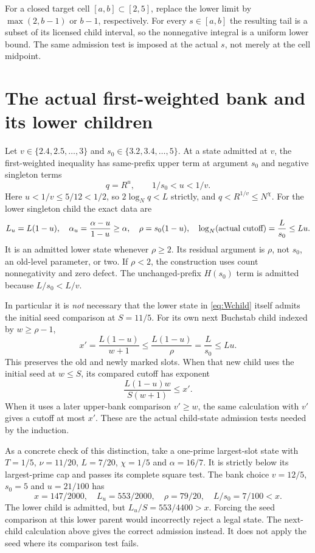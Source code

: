 \documentclass[11pt]{article}
\begin{document}
For a closed target cell $[a,b]\subset[2,5]$, replace the lower limit
by $\max(2,b-1)$ or $b-1$, respectively. For every $s\in[a,b]$ the
resulting tail is a subset of its licensed child interval, so the
nonnegative integral is a uniform lower bound. The same admission
test is imposed at the actual $s$, not merely at the cell midpoint.

\section{The actual first-weighted bank and its lower children}
Let $v\in\{2.4,2.5,\ldots,3\}$ and
$s_0\in\{3.2,3.4,\ldots,5\}$. At a state admitted at $v$, the
first-weighted inequality has same-prefix upper term at argument
$s_0$ and negative singleton terms
\[
 q=R^u,\qquad 1/s_0<u<1/v.
\]
Here $u<1/v\le5/12<1/2$, so $2\log_Nq<L$ strictly, and
$q<R^{1/v}\le N^\chi$. For the lower singleton child the exact data are
\begin{equation}\label{eq:Wchild}
 L_u=L(1-u),\quad \alpha_u=\frac{\alpha-u}{1-u}\ge\alpha,\quad
 \rho=s_0(1-u),\quad
 \log_N(\hbox{actual cutoff})=\frac L{s_0}\le Lu.
\end{equation}
It is an admitted lower state whenever $\rho\ge2$. Its residual
argument is $\rho$, not $s_0$, an old-level parameter, or two. If
$\rho<2$, the construction uses count nonnegativity and zero defect.
The unchanged-prefix $H(s_0)$ term is admitted because $L/s_0<L/v$.

In particular it is \emph{not} necessary that the lower state in
\eqref{eq:Wchild} itself admits the initial seed comparison at $S=11/5$.
For its own next Buchstab child indexed by $w\ge\rho-1$,
\[
 x'=\frac{L(1-u)}{w+1}\le\frac{L(1-u)}\rho
      =\frac L{s_0}\le Lu.
\]
This preserves the old and newly marked slots. When that new child
uses the initial seed at $w\le S$, its compared cutoff has exponent
\[
             \frac{L(1-u)w}{S(w+1)}\le x'.
\]
When it uses a later upper-bank comparison $v'\ge w$, the same
calculation with $v'$ gives a cutoff at most $x'$. These are the actual
child-state admission tests needed by the induction.

As a concrete check of this distinction, take a one-prime largest-slot
state with $T=1/5$, $\nu=11/20$, $L=7/20$, $\chi=1/5$ and
$\alpha=16/7$. It is strictly below its largest-prime cap and passes
its complete square test. The bank choice $v=12/5$, $s_0=5$ and
$u=21/100$ has
\[
 x=147/2000,\quad L_u=553/2000,\quad
 \rho=79/20,\quad L/s_0=7/100<x.
\]
The lower child is admitted, but $L_u/S=553/4400>x$.
Forcing the seed comparison at this lower parent would incorrectly
reject a legal state. The next-child calculation above gives the
correct admission instead. It does not apply the seed where its
comparison test fails.
\end{document}
